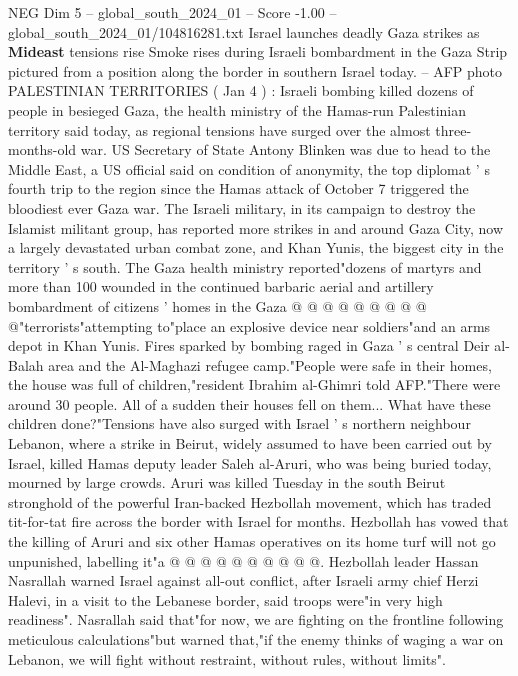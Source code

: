 \begin{textsample}{NEG Dim 5 – global\_south\_2024\_01 – Score -1.00 – global\_south\_2024\_01/104816281.txt}  \label{ex:f5_neg_440}
Israel launches deadly Gaza strikes as \textbf{Mideast} tensions rise Smoke rises during Israeli bombardment in the Gaza Strip pictured from a position along the border in southern Israel today. -- AFP photo PALESTINIAN TERRITORIES ( Jan 4 ) : Israeli bombing killed dozens of people in besieged Gaza, the health ministry of the Hamas-run Palestinian territory said today, as regional tensions have surged over the almost three-months-old war.
US Secretary of State Antony Blinken was due to head to the Middle East, a US official said on condition of anonymity, the top diplomat ' s fourth trip to the region since the Hamas attack of October 7 triggered the bloodiest ever Gaza war.
The Israeli military, in its campaign to destroy the Islamist militant group, has reported more strikes in and around Gaza City, now a largely devastated urban combat zone, and Khan Yunis, the biggest city in the territory ' s south.
The Gaza health ministry reported"dozens of martyrs and more than 100 wounded in the continued barbaric aerial and artillery bombardment of citizens ' homes in the Gaza @ @ @ @ @ @ @ @ @ @"terrorists"attempting to"place an explosive device near soldiers"and an arms depot in Khan Yunis.
Fires sparked by bombing raged in Gaza ' s central Deir al-Balah area and the Al-Maghazi refugee camp."People were safe in their homes, the house was full of children,"resident Ibrahim al-Ghimri told AFP."There were around 30 people.
All of a sudden their houses fell on them...
What have these children done?"Tensions have also surged with Israel ' s northern neighbour Lebanon, where a strike in Beirut, widely assumed to have been carried out by Israel, killed Hamas deputy leader Saleh al-Aruri, who was being buried today, mourned by large crowds.
Aruri was killed Tuesday in the south Beirut stronghold of the powerful Iran-backed Hezbollah movement, which has traded tit-for-tat fire across the border with Israel for months.
Hezbollah has vowed that the killing of Aruri and six other Hamas operatives on its home turf will not go unpunished, labelling it"a @ @ @ @ @ @ @ @ @ @.
Hezbollah leader Hassan Nasrallah warned Israel against all-out conflict, after Israeli army chief Herzi Halevi, in a visit to the Lebanese border, said troops were"in very high readiness".
Nasrallah said that"for now, we are fighting on the frontline following meticulous calculations"but warned that,"if the enemy thinks of waging a war on Lebanon, we will fight without restraint, without rules, without limits".

\end{textsample}
